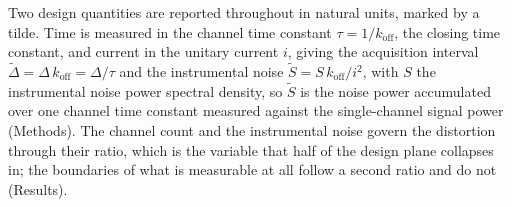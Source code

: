 Two design quantities are reported throughout in natural units, marked by a tilde. Time is measured
in the channel time constant $\tau=1/k_{\mathrm{off}}$, the closing time constant, and current in
the unitary current $i$, giving the acquisition interval
$\widetilde{\Delta}=\Delta\,k_{\mathrm{off}}=\Delta/\tau$ and the instrumental noise
$\widetilde{S}=S\,k_{\mathrm{off}}/i^{2}$, with $S$ the instrumental noise power spectral density,
so $\widetilde{S}$ is the noise power accumulated over one channel time constant measured against
the single-channel signal power (Methods).
The channel count and the instrumental noise govern the distortion through their
ratio, which is the variable that half of the design plane collapses in; the boundaries of what is
measurable at all follow a second ratio and do not (Results).
%
